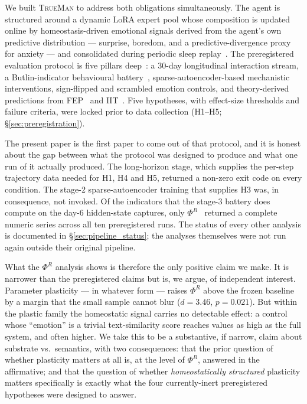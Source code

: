 \documentclass[pdflatex,sn-mathphys-num]{sn-jnl}
\newcommand{\TrueMan}{\textsc{TrueMan}}
\theoremstyle{thmstyleone}
\theoremstyle{thmstylethree}
\begin{document}
We built \TrueMan{} to address both obligations simultaneously. The agent is structured around a dynamic LoRA expert pool whose composition is updated online by homeostasis-driven emotional signals derived from the agent's own predictive distribution --- surprise, boredom, and a predictive-divergence proxy for anxiety --- and consolidated during periodic sleep replay~\cite{trueman_v1_arxiv}. The preregistered evaluation protocol is five pillars deep~\cite{preregistration}: a 30-day longitudinal interaction stream, a Butlin-indicator behavioural battery~\cite{butlin2023consciousness}, sparse-autoencoder-based mechanistic interventions, sign-flipped and scrambled emotion controls, and theory-derived predictions from FEP~\cite{friston2022active} and IIT~\cite{tononi2023iit}. Five hypotheses, with effect-size thresholds and failure criteria, were locked prior to data collection (H1--H5; \S\ref{sec:preregistration}).

The present paper is the first paper to come out of that protocol, and it is honest about the gap between what the protocol was designed to produce and what one run of it actually produced. The long-horizon stage, which supplies the per-step trajectory data needed for H1, H4 and H5, returned a non-zero exit code on every condition. The stage-2 sparse-autoencoder training that supplies H3 was, in consequence, not invoked. Of the indicators that the stage-3 battery does compute on the day-6 hidden-state captures, only $\Phi^R$~\cite{mediano2021phir} returned a complete numeric series across all ten preregistered runs. The status of every other analysis is documented in \S\ref{sec:pipeline_status}; the analyses themselves were not run again outside their original pipeline.

What the $\Phi^R$ analysis shows is therefore the only positive claim we make. It is narrower than the preregistered claims but is, we argue, of independent interest. Parameter plasticity --- in whatever form --- raises $\Phi^R$ above the frozen baseline by a margin that the small sample cannot blur ($d = 3.46$, $p = 0.021$). But within the plastic family the homeostatic signal carries no detectable effect: a control whose ``emotion'' is a trivial text-similarity score reaches values as high as the full system, and often higher. We take this to be a substantive, if narrow, claim about substrate vs.\ semantics, with two consequences: that the prior question of whether plasticity matters at all is, at the level of $\Phi^R$, answered in the affirmative; and that the question of whether \emph{homeostatically structured} plasticity matters specifically is exactly what the four currently-inert preregistered hypotheses were designed to answer.
\end{document}
